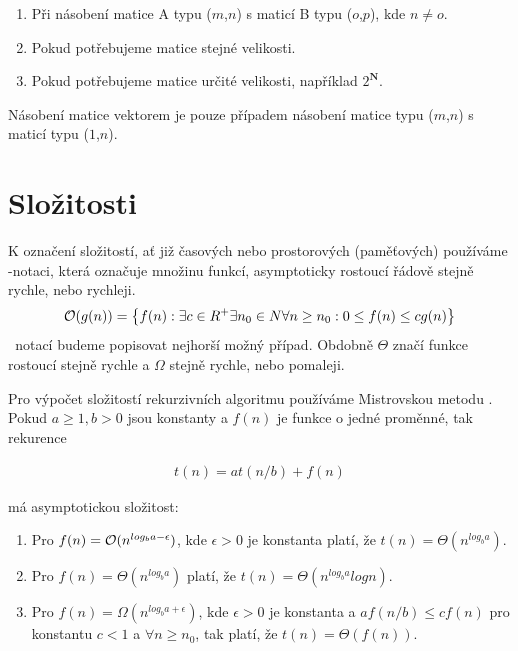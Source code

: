 \begin{enumerate}
  \item Při násobení matice A typu ($m$,$n$) s maticí B typu ($o$,$p$), kde $ n \neq o $.
  \item Pokud potřebujeme matice stejné velikosti.
  \item Pokud potřebujeme matice určité velikosti, například $ 2^{ \mathbf{N}} $.
\end{enumerate}

Násobení matice vektorem je pouze případem násobení matice typu ($m$,$n$) s maticí typu ($1$,$n$).

\section{Složitosti}

K označení složitostí, ať již časových nebo prostorových (paměťových) používáme \bigO-notaci, která označuje množinu funkcí, asymptoticky rostoucí řádově stejně rychle, nebo rychleji.
\begin{align}
\mathcal{O}(g(n)) = \left\{ f(n) : \exists c \in R^+ \exists n_0 \in N \forall n \geq n_0 : 0 \leq f(n) \leq cg(n) \right\}
\end{align}
\bigO\texttt{ }notací budeme popisovat nejhorší možný případ. Obdobně $\Theta$ značí funkce rostoucí stejně rychle a $\Omega$ stejně rychle, nebo pomaleji.


Pro výpočet složitostí rekurzivních algoritmu používáme Mistrovskou metodu \cite{Cormen:2001:IA:580470}. Pokud $a \geq 1, b > 0$ jsou konstanty a $f(n)$ je funkce o jedné proměnné, tak rekurence

\begin{align}
t(n) = at(n/b)+f(n)
\end{align}

má asymptotickou složitost:

\begin{enumerate}
  \item Pro $f(n) = \mathcal{O}(n^{log_b{a - \epsilon}})$, kde $\epsilon > 0$ je konstanta platí, že $t(n)=\Theta(n^{log_b{a}})$.
  \item Pro $f(n) = \Theta(n^{log_b{a}})$ platí, že $t(n)=\Theta(n^{log_b{a}}log{n})$.
  \item Pro $f(n) = \Omega(n^{log_b{a + \epsilon}})$, kde $\epsilon > 0$ je konstanta a $af(n/b) \leq cf(n)$ pro konstantu $c < 1$ a $\forall n\geq n_0$, tak platí, že $t(n)=\Theta(f(n))$.
\end{enumerate}

